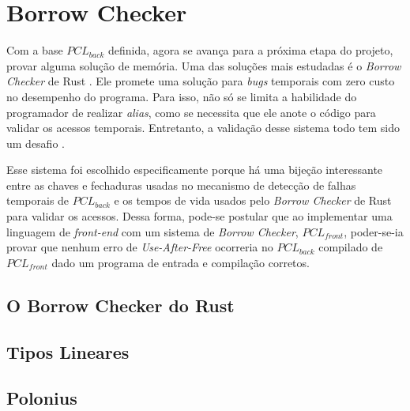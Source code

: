 \chapter{Borrow Checker}
\label{chap4}

Com a base $PCL_{back}$ definida, agora se avança para a próxima etapa do projeto, provar alguma solução de memória. Uma das soluções mais estudadas é o \emph{Borrow Checker} de Rust \cite{RUSTBOOK}. Ele promete uma solução para \emph{bugs} temporais com zero custo no desempenho do programa. Para isso, não só se limita a habilidade do programador de realizar \emph{alias}, como se necessita que ele anote o código para validar os acessos temporais. Entretanto, a validação desse sistema todo tem sido um desafio \cite{RUSTBELT,RUSTSYMBOLIC}.


Esse sistema foi escolhido especificamente porque há uma bijeção interessante entre as chaves e fechaduras usadas no mecanismo de detecção de falhas temporais de $PCL_{back}$ e os tempos de vida usados pelo \emph{Borrow Checker} de Rust para validar os acessos. Dessa forma, pode-se postular que ao implementar uma linguagem de \emph{front-end} com um sistema de \emph{Borrow Checker}, $PCL_{front}$, poder-se-ia provar que nenhum erro de \emph{Use-After-Free} ocorreria no $PCL_{back}$ compilado de $PCL_{front}$ dado um programa de entrada e compilação corretos.


\section{O Borrow Checker do Rust}

\section{Tipos Lineares}

\section{Polonius}
